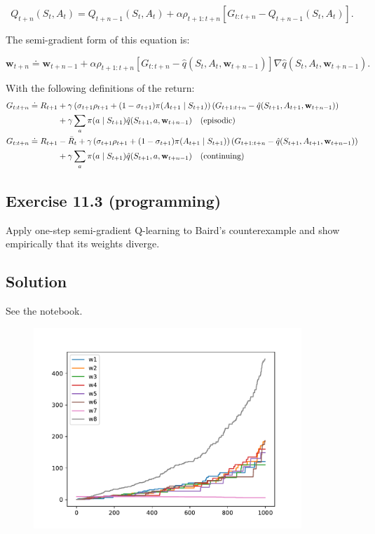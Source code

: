 \[
    Q_{t+n}(S_t, A_t) = Q_{t+n-1}(S_t, A_t) + \alpha \rho_{t+1:t+n} [G_{t:t+n} - Q_{t+n-1}(S_t, A_t)].
\]

The semi-gradient form of this equation is:

\[
    \mathbf{w}_{t+n} \doteq \mathbf{w}_{t+n-1} + \alpha \rho_{t+1:t+n}\left[G_{t:t+n} - \hat{q}(S_t, A_t, \mathbf{w}_{t+n-1})\right]\nabla \hat{q}(S_t,A_t,\mathbf{w}_{t+n-1}).
\]

With the following definitions of the return:
{\scriptsize 
\begin{align*}
    G_{t:t+n} \doteq R_{t+1} &+ \gamma \left( \sigma_{t+1} \rho_{t+1} + (1 - \sigma_{t+1}) \pi(A_{t+1} \mid S_{t+1}) \right) \left( G_{t+1:t+n} - \hat{q}(S_{t+1}, A_{t+1},\mathbf{w}_{t+n-1}) \right) \\
    &+ \gamma \sum_a \pi(a \mid S_{t+1}) \hat{q}(S_{t+1}, a,\mathbf{w}_{t+n-1}) \text{\quad (episodic)}\\
    G_{t:t+n} \doteq R_{t+1} &- \bar{R}_{t} + \gamma \left( \sigma_{t+1} \rho_{t+1} + (1 - \sigma_{t+1}) \pi(A_{t+1} \mid S_{t+1}) \right) \left( G_{t+1:t+n} - \hat{q}(S_{t+1}, A_{t+1},\mathbf{w}_{t+n-1}) \right) \\
    &+ \gamma \sum_a \pi(a \mid S_{t+1}) \hat{q}(S_{t+1}, a,\mathbf{w}_{t+n-1}) \text{\quad (continuing)}
\end{align*}
}
\subsection*{Exercise 11.3 (programming)}

Apply one-step semi-gradient Q-learning to Baird's counterexample and show empirically that its weights diverge. 

\subsection*{Solution}
See the notebook.
\begin{figure}[H]
    \centering
    \includegraphics[width=0.9\textwidth]{chapters_latex/figures/ex_11_03.pdf}
    \captionsetup{labelformat=empty}
\end{figure}

